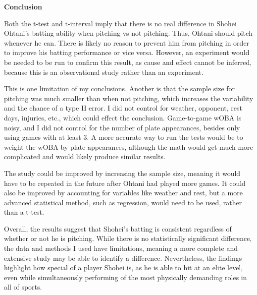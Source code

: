\documentclass[12pt]{article}
\begin{document}
\pagestyle{empty}
\begin{center}
    \Huge \textbf{Conclusion}
\end{center}

Both the t-test and t-interval imply that there is no real difference in Shohei Ohtani's batting ability when pitching vs not pitching. Thus, Ohtani should pitch whenever he can. There is likely no reason to prevent him from pitching in order to improve his batting performance or vice versa. However, an experiment would be needed to be run to confirm this result, as cause and effect cannot be inferred, because this is an observational study rather than an experiment.

This is one limitation of my conclusions. Another is that the sample size for pitching was much smaller than when not pitching, which increases the variability and the chance of a type II error. I did not control for weather, opponent, rest days, injuries, etc., which could effect the conclusion. Game-to-game wOBA is noisy, and I did not control for the number of plate appearances, besides only using games with at least 3. A more accurate way to run the tests would be to weight the wOBA by plate appearances, although the math would get much more complicated and would likely produce similar results.

The study could be improved by increasing the sample size, meaning it would have to be repeated in the future after Ohtani had played more games. It could also be improved by accounting for variables like weather and rest, but a more advanced statistical method, such as regression, would need to be used, rather than a t-test.

Overall, the results suggest that Shohei's batting is consistent regardless of whether or not he is pitching. While there is no statistically significant difference, the data and methods I used have limitations, meaning a more complete and extensive study may be able to identify a difference. Nevertheless, the findings highlight how special of a player Shohei is, as he is able to hit at an elite level, even while simultaneously performing of the most physically demanding roles in all of sports.
\end{document}
